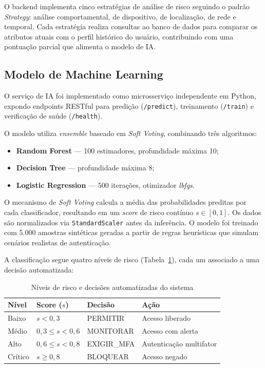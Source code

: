 \documentclass[12pt]{article}
\begin{document}
O backend implementa cinco estratégias de análise de risco seguindo o padrão \textit{Strategy}: análise comportamental, de dispositivo, de localização, de rede e temporal. Cada estratégia realiza consultas ao banco de dados para comparar os atributos atuais com o perfil histórico do usuário, contribuindo com uma pontuação parcial que alimenta o modelo de IA.

\subsection{Modelo de Machine Learning}

O serviço de IA foi implementado como microsserviço independente em Python, expondo endpoints RESTful para predição (\texttt{/predict}), treinamento (\texttt{/train}) e verificação de saúde (\texttt{/health}).

O modelo utiliza \textit{ensemble} baseado em \textit{Soft Voting}, combinando três algoritmos:

\begin{itemize}[leftmargin=*]
    \item \textbf{Random Forest} --- 100 estimadores, profundidade máxima 10;
    \item \textbf{Decision Tree} --- profundidade máxima 8;
    \item \textbf{Logistic Regression} --- 500 iterações, otimizador \textit{lbfgs}.
\end{itemize}

O mecanismo de \textit{Soft Voting} calcula a média das probabilidades preditas por cada classificador, resultando em um \textit{score} de risco contínuo $s \in [0, 1]$. Os dados são normalizados via \texttt{StandardScaler} antes da inferência. O modelo foi treinado com 5.000 amostras sintéticas geradas a partir de regras heurísticas que simulam cenários realistas de autenticação.

A classificação segue quatro níveis de risco (Tabela~\ref{tab:risk_levels}), cada um associado a uma decisão automatizada:

\begin{table}[H]
\centering
\caption{Níveis de risco e decisões automatizadas do sistema}
\label{tab:risk_levels}
\small
\begin{tabular}{@{}llll@{}}
\toprule
\textbf{Nível} & \textbf{Score ($s$)} & \textbf{Decisão} & \textbf{Ação} \\
\midrule
Baixo    & $s < 0{,}3$            & PERMITIR    & Acesso liberado \\
Médio    & $0{,}3 \leq s < 0{,}6$ & MONITORAR   & Acesso com alerta \\
Alto     & $0{,}6 \leq s < 0{,}8$ & EXIGIR\_MFA & Autenticação multifator \\
Crítico  & $s \geq 0{,}8$         & BLOQUEAR    & Acesso negado \\
\bottomrule
\end{tabular}
\end{table}
\end{document}
